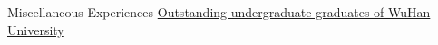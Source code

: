 \begin{rubric}{Miscellaneous Experiences}
\entry*[2017-06] \href{http://info.whu.edu.cn/info/1630/170326.htm}{Outstanding undergraduate graduates of WuHan University}
\end{rubric}
